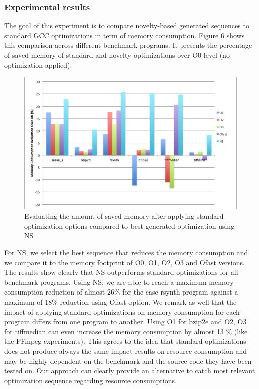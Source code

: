 \subsubsection{Experimental results}

The goal of this experiment is to compare novelty-based generated sequences to standard GCC optimizations in term of memory consumption. Figure 6 shows this comparison across different benchmark programs. It presents the percentage of saved memory of standard and novelty optimizations over O0 level (no optimization applied).
 
\begin{figure}[!ht]
	\centering
	\includegraphics[width=1.\linewidth]{Ressources/infra_novelty_stat3.png}
	\caption{Evaluating the amount of saved memory after applying standard optimization options compared to best generated optimization using NS}
\end{figure}

For NS, we select the best sequence that reduces the memory consumption and we compare it to the memory footprint of O0, O1, O2, O3 and Ofast versions. The results show clearly that NS outperforms standard optimizations for all benchmark programs. Using NS, we are able to reach a maximum memory consumption reduction of almost 26\% for the case rsynth program against a maximum of 18\% reduction using Ofast option. We remark as well that the impact of applying standard optimizations on memory consumption for each program differs from one program to another. Using O1 for bzip2e and O2, O3 for tiffmedian can even increase the memory consumption by almost 13 \% (like the FFmpeg experiments). This agrees to the idea that standard optimizations does not produce always the same impact results on resource consumption and may be highly dependent on the benchmark and the source code they have been tested on. Our approach can clearly provide an alternative to catch most relevant optimization sequence regarding resource consumptions.

